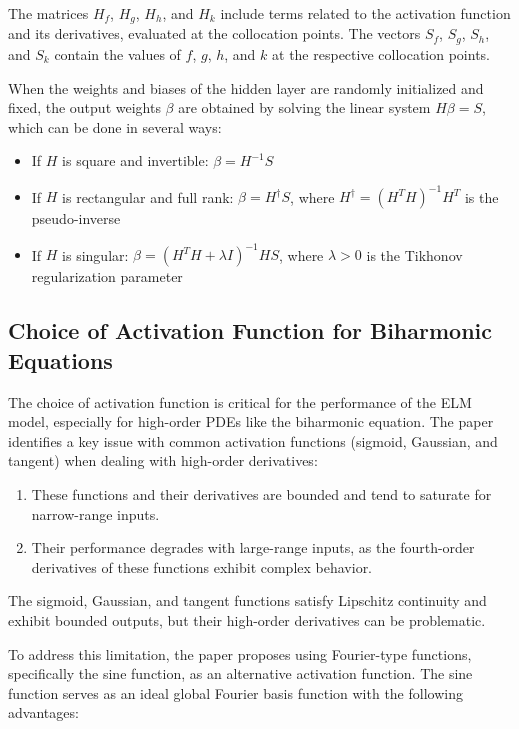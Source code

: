 \documentclass[11pt]{article}
\begin{document}
The matrices $H_f$, $H_g$, $H_h$, and $H_k$ include terms related to the activation function and its derivatives, evaluated at the collocation points. The vectors $S_f$, $S_g$, $S_h$, and $S_k$ contain the values of $f$, $g$, $h$, and $k$ at the respective collocation points.

When the weights and biases of the hidden layer are randomly initialized and fixed, the output weights $\beta$ are obtained by solving the linear system $H\beta = S$, which can be done in several ways:

\begin{itemize}
    \item If $H$ is square and invertible: $\beta = H^{-1}S$
    \item If $H$ is rectangular and full rank: $\beta = H^{\dagger}S$, where $H^{\dagger} = (H^TH)^{-1}H^T$ is the pseudo-inverse
    \item If $H$ is singular: $\beta = (H^TH + \lambda I)^{-1}HS$, where $\lambda > 0$ is the Tikhonov regularization parameter
\end{itemize}

\subsection{Choice of Activation Function for Biharmonic Equations}

The choice of activation function is critical for the performance of the ELM model, especially for high-order PDEs like the biharmonic equation. The paper identifies a key issue with common activation functions (sigmoid, Gaussian, and tangent) when dealing with high-order derivatives:

\begin{enumerate}
    \item These functions and their derivatives are bounded and tend to saturate for narrow-range inputs.
    \item Their performance degrades with large-range inputs, as the fourth-order derivatives of these functions exhibit complex behavior.
\end{enumerate}

The sigmoid, Gaussian, and tangent functions satisfy Lipschitz continuity and exhibit bounded outputs, but their high-order derivatives can be problematic. 

To address this limitation, the paper proposes using Fourier-type functions, specifically the sine function, as an alternative activation function. The sine function serves as an ideal global Fourier basis function with the following advantages:
\end{document}
